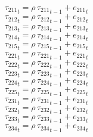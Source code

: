 \begin{dmath}
{{\tau_{211}}}_{t}={{\rho}}\, {{\tau_{211}}}_{t-1}+{{e_{211}}}_{t}
\end{dmath}
\begin{dmath}
{{\tau_{212}}}_{t}={{\rho}}\, {{\tau_{212}}}_{t-1}+{{e_{212}}}_{t}
\end{dmath}
\begin{dmath}
{{\tau_{213}}}_{t}={{\rho}}\, {{\tau_{213}}}_{t-1}+{{e_{213}}}_{t}
\end{dmath}
\begin{dmath}
{{\tau_{214}}}_{t}={{\rho}}\, {{\tau_{214}}}_{t-1}+{{e_{214}}}_{t}
\end{dmath}
\begin{dmath}
{{\tau_{215}}}_{t}={{\rho}}\, {{\tau_{215}}}_{t-1}+{{e_{215}}}_{t}
\end{dmath}
\begin{dmath}
{{\tau_{221}}}_{t}={{\rho}}\, {{\tau_{221}}}_{t-1}+{{e_{221}}}_{t}
\end{dmath}
\begin{dmath}
{{\tau_{222}}}_{t}={{\rho}}\, {{\tau_{222}}}_{t-1}+{{e_{222}}}_{t}
\end{dmath}
\begin{dmath}
{{\tau_{223}}}_{t}={{\rho}}\, {{\tau_{223}}}_{t-1}+{{e_{223}}}_{t}
\end{dmath}
\begin{dmath}
{{\tau_{224}}}_{t}={{\rho}}\, {{\tau_{224}}}_{t-1}+{{e_{224}}}_{t}
\end{dmath}
\begin{dmath}
{{\tau_{225}}}_{t}={{\rho}}\, {{\tau_{225}}}_{t-1}+{{e_{225}}}_{t}
\end{dmath}
\begin{dmath}
{{\tau_{231}}}_{t}={{\rho}}\, {{\tau_{231}}}_{t-1}+{{e_{231}}}_{t}
\end{dmath}
\begin{dmath}
{{\tau_{232}}}_{t}={{\rho}}\, {{\tau_{232}}}_{t-1}+{{e_{232}}}_{t}
\end{dmath}
\begin{dmath}
{{\tau_{233}}}_{t}={{\rho}}\, {{\tau_{233}}}_{t-1}+{{e_{233}}}_{t}
\end{dmath}
\begin{dmath}
{{\tau_{234}}}_{t}={{\rho}}\, {{\tau_{234}}}_{t-1}+{{e_{234}}}_{t}
\end{dmath}
